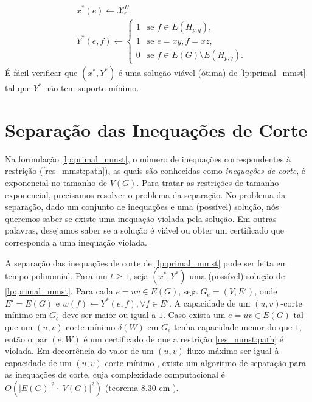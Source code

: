\documentclass[11pt,reqno]{amsart}
\newcommand{\incid}{\mathcal{X}}
\begin{document}
\begin{align*}
&x^*(e) \leftarrow \incid^{H}_{e},\\
&Y^*(e,f)\leftarrow
\begin{cases}
    1& \text{se $f \in E(H_{p,q}),$}\\
    1& \text{se $e = xy, f = xz,$}\\
    0& \text{se $f \in E(G) \setminus E(H_{p,q}).$}
\end{cases}
\end{align*}
É fácil verificar que $(x^*,Y^*)$ é uma solução viável (ótima) de \ref{lp:primal_mmst} 
tal que $Y^*$ não tem suporte mínimo.

\section{Separação das Inequações de Corte}

Na formulação \ref{lp:primal_mmst}, o número de inequações correspondentes à 
restrição (\ref{res_mmst:path}), as quais são conhecidas como 
\emph{inequações de corte}, é exponencial no tamanho de $V(G)$. 
Para tratar 
as restrições de tamanho exponencial, precisamos resolver o problema da 
separação. No problema da separação, dado um conjunto de inequações e uma 
(possível) solução, nós queremos saber se existe uma inequação violada pela 
solução. 
Em outras palavras, desejamos saber se a solução é viável ou obter um 
certificado que corresponda a uma inequação violada. 

A separação das inequações de corte de \ref{lp:primal_mmst} 
pode ser feita em tempo polinomial. Para um $t \ge 1$, seja $(x^*, Y^*)$ uma 
(possível) solução 
de \ref{lp:primal_mmst}. 
Para cada $e=uv \in E(G)$, seja $G_{e} = (V, E')$, onde 
$E' = E(G)$ e $w(f) \leftarrow Y^*(e,f), \forall f \in E'$. A capacidade de 
um $(u,v)$-corte mínimo em $G_{e}$ deve ser maior ou igual a $1$. Caso 
exista 
um $e=uv \in E(G)$ tal que um $(u,v)$-corte mínimo $\delta(W)$ em $G_{e}$ 
tenha capacidade menor do que $1$, então o par $(e,W)$ é um certificado de que a 
restrição \ref{res_mmst:path} é violada. Em decorrência do 
valor de um $(u,v)$-fluxo máximo ser igual à capacidade de um 
$(u,v)$-corte mínimo \cite{DantzigF1956}, existe um algoritmo de 
separação para as inequações de corte, cuja complexidade 
computacional é $O(|E(G)|^{2} \cdot |V(G)|^{2})$ (teorema 8.30 em 
\cite{KorteV2012}).
\end{document}
